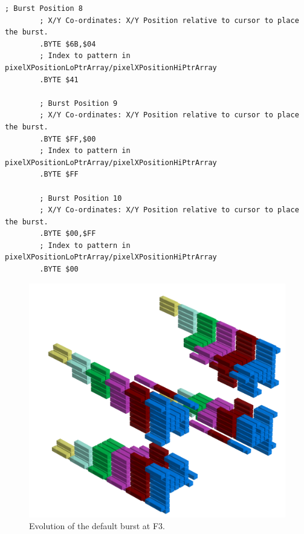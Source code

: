 \begin{lstlisting}[basicstyle=\tiny,caption=Source code for the F2 Burst.]
        ; Burst Position 8
        ; X/Y Co-ordinates: X/Y Position relative to cursor to place the burst.
        .BYTE $6B,$04
        ; Index to pattern in pixelXPositionLoPtrArray/pixelXPositionHiPtrArray
        .BYTE $41

        ; Burst Position 9
        ; X/Y Co-ordinates: X/Y Position relative to cursor to place the burst.
        .BYTE $FF,$00
        ; Index to pattern in pixelXPositionLoPtrArray/pixelXPositionHiPtrArray
        .BYTE $FF

        ; Burst Position 10
        ; X/Y Co-ordinates: X/Y Position relative to cursor to place the burst.
        .BYTE $00,$FF
        ; Index to pattern in pixelXPositionLoPtrArray/pixelXPositionHiPtrArray
        .BYTE $00
\end{lstlisting}

\clearpage
\begin{figure}[H]
    \centering
    \begin{adjustbox}{width=12cm,center}
      \includegraphics[width=12cm]{src/patterns/bursts/pattern2-45.png}%
    \end{adjustbox}
\caption{Evolution of the default burst at F3.}
\end{figure}
\clearpage

